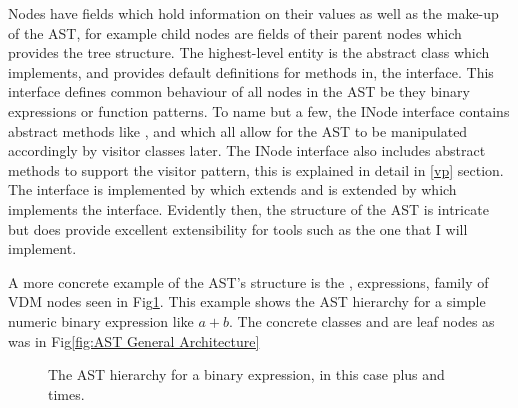 Nodes have fields which hold information on their values as well as the make-up of the AST, for example child nodes are fields of their parent nodes which provides the tree structure. The highest-level entity is the abstract  class which implements, and provides default definitions for methods in, the  interface. This interface defines common behaviour of all nodes in the AST be they binary expressions or function patterns. To name but a few, the INode interface contains abstract methods like ,  and  which all allow for the AST to be manipulated accordingly by visitor classes later. The INode interface also includes abstract  methods to support the visitor pattern, this is explained in detail in \ref{vp} section. The  interface is implemented by  which extends  and is extended by  which implements the  interface. Evidently then, the structure of the AST is intricate but does provide excellent extensibility for tools such as the one that I will implement.

A more concrete example of the AST's structure is the , expressions, family of VDM nodes seen in Fig\ref{fig:The AST hierarchy for a binary expression}. This example shows the AST hierarchy for a simple numeric binary expression like $a + b$. The concrete classes  and  are leaf nodes as  was in Fig\ref{fig:AST General Architecture}\begin{figure}
        \caption{\label{fig:The AST hierarchy for a binary expression} The AST hierarchy for a binary expression, in this case plus and times. \parencite{vdmwikiast}}
      \end{figure}

